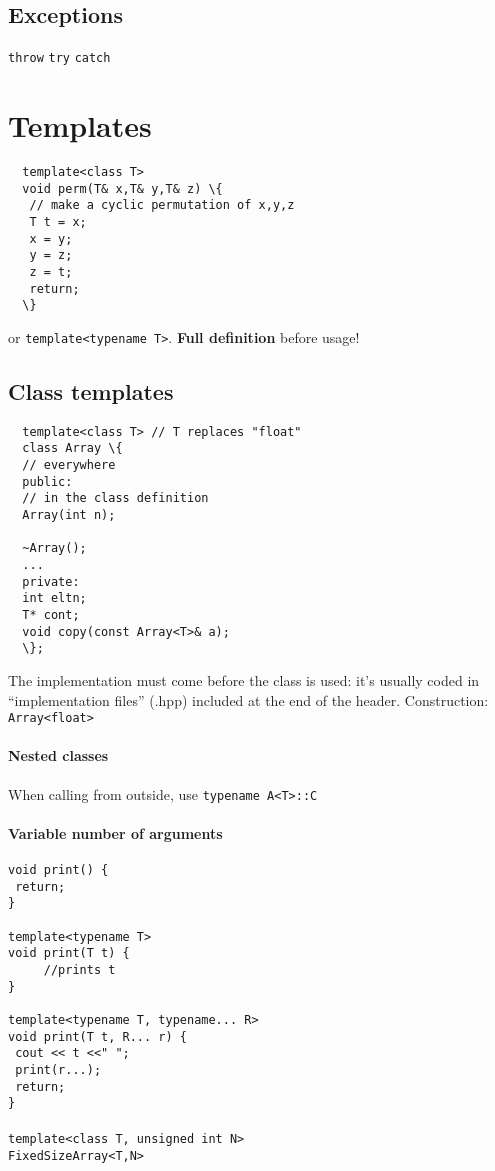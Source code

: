 \documentclass{article}
\begin{document}
\subsection{Exceptions}
\texttt{throw}
\texttt{try}
\texttt{catch}


\section{Templates}
\begin{lstlisting}
  template<class T>
  void perm(T& x,T& y,T& z) \{
   // make a cyclic permutation of x,y,z
   T t = x;
   x = y;
   y = z;
   z = t;
   return;
  \}
\end{lstlisting}
or \texttt{template<typename T>}.
\textbf{Full definition} before usage!

\subsection{Class templates}
\begin{lstlisting}
  template<class T> // T replaces "float"
  class Array \{
  // everywhere
  public:
  // in the class definition
  Array(int n);
  
  ~Array();
  ...
  private:
  int eltn;
  T* cont;
  void copy(const Array<T>& a);
  \};
\end{lstlisting}
The implementation must come before the class is used:
it’s usually coded in “implementation files” (.hpp)
included at the end of the header.
Construction: \texttt{Array<float>}
\paragraph{Nested classes}
When calling from outside, use \texttt{typename A<T>::C}
\paragraph{Variable number of arguments}
\begin{lstlisting}
void print() {
 return;
}

template<typename T>
void print(T t) {
     //prints t
}

template<typename T, typename... R>
void print(T t, R... r) {
 cout << t <<" ";
 print(r...);
 return;
}
\end{lstlisting}
\paragraph{}
\begin{lstlisting}
template<class T, unsigned int N>
FixedSizeArray<T,N>
\end{lstlisting}
\end{document}
